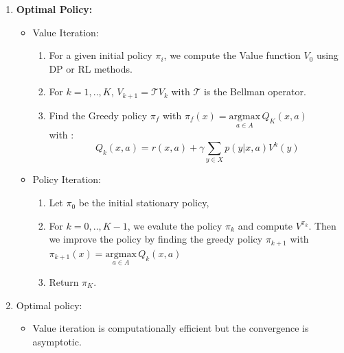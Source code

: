 \documentclass[a4paper,10pt]{article}
\begin{document}
\begin{enumerate}[label=\underline{\textbf{Q\arabic*}:}]
\begin{itemize}
\end{itemize}

\item  \textbf{Optimal Policy: } 

\begin{itemize}
\item Value Iteration: 
\begin{enumerate}[label=\arabic*.]
\item For a given initial policy $\pi_i$, we compute the Value function $V_0$ using DP or RL methods. 
\item For $k=1,..,K$,  $V_{k+1} = \mathcal{T} V_k $ with $\mathcal{T}$ is the Bellman operator. 
\item Find the Greedy policy $\pi_f$ with $\pi_f (x) = \underset{a \in A}{\text{argmax}} \, Q_K(x,a)$ \\ 
with : 
\[
Q_k(x,a) = r(x,a) + \gamma \sum_{y \in X} p(y|x,a) V^k (y) 
\]
\end{enumerate}


\item Policy Iteration: 

\begin{enumerate}[label=\arabic*.]
\item Let $\pi_0$ be the initial stationary policy,
\item For $k=0,..,K-1$, we evalute the policy $\pi_k$ and compute $V^{\pi_k}$. Then we improve the policy by finding the greedy policy $\pi_{k+1}$ with $\pi_{k+1} (x) = \underset{a \in A}{\text{argmax}} \, Q_k(x,a)$ 
\item Return $\pi_{K}$.
\end{enumerate}

\end{itemize}

\item Optimal policy: 
\begin{itemize}
\item Value iteration is computationally efficient but the convergence is asymptotic. 


\end{itemize}
\end{enumerate}
\end{document}
